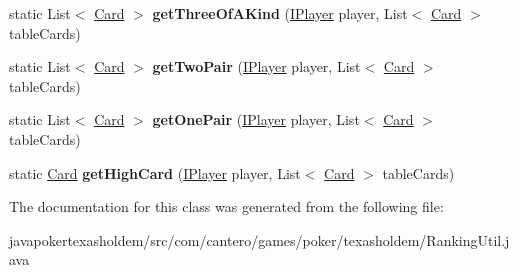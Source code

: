 \begin{DoxyCompactItemize}
\item 
\hypertarget{classcom_1_1cantero_1_1games_1_1poker_1_1texasholdem_1_1_ranking_util_aaba1e43f991f0980504f9c89c1c02f7a}{}static List$<$ \hyperlink{classcom_1_1cantero_1_1games_1_1poker_1_1texasholdem_1_1_card}{Card} $>$ {\bfseries get\+Three\+Of\+A\+Kind} (\hyperlink{interfacecom_1_1cantero_1_1games_1_1poker_1_1texasholdem_1_1_i_player}{I\+Player} player, List$<$ \hyperlink{classcom_1_1cantero_1_1games_1_1poker_1_1texasholdem_1_1_card}{Card} $>$ table\+Cards)\label{classcom_1_1cantero_1_1games_1_1poker_1_1texasholdem_1_1_ranking_util_aaba1e43f991f0980504f9c89c1c02f7a}

\item 
\hypertarget{classcom_1_1cantero_1_1games_1_1poker_1_1texasholdem_1_1_ranking_util_a9f5d327cc9ce8375f7df95ed7afd675d}{}static List$<$ \hyperlink{classcom_1_1cantero_1_1games_1_1poker_1_1texasholdem_1_1_card}{Card} $>$ {\bfseries get\+Two\+Pair} (\hyperlink{interfacecom_1_1cantero_1_1games_1_1poker_1_1texasholdem_1_1_i_player}{I\+Player} player, List$<$ \hyperlink{classcom_1_1cantero_1_1games_1_1poker_1_1texasholdem_1_1_card}{Card} $>$ table\+Cards)\label{classcom_1_1cantero_1_1games_1_1poker_1_1texasholdem_1_1_ranking_util_a9f5d327cc9ce8375f7df95ed7afd675d}

\item 
\hypertarget{classcom_1_1cantero_1_1games_1_1poker_1_1texasholdem_1_1_ranking_util_a323a8b6711b2e02e89be26f755209ad8}{}static List$<$ \hyperlink{classcom_1_1cantero_1_1games_1_1poker_1_1texasholdem_1_1_card}{Card} $>$ {\bfseries get\+One\+Pair} (\hyperlink{interfacecom_1_1cantero_1_1games_1_1poker_1_1texasholdem_1_1_i_player}{I\+Player} player, List$<$ \hyperlink{classcom_1_1cantero_1_1games_1_1poker_1_1texasholdem_1_1_card}{Card} $>$ table\+Cards)\label{classcom_1_1cantero_1_1games_1_1poker_1_1texasholdem_1_1_ranking_util_a323a8b6711b2e02e89be26f755209ad8}

\item 
\hypertarget{classcom_1_1cantero_1_1games_1_1poker_1_1texasholdem_1_1_ranking_util_a65017de417678c005ecdf70c6464f60e}{}static \hyperlink{classcom_1_1cantero_1_1games_1_1poker_1_1texasholdem_1_1_card}{Card} {\bfseries get\+High\+Card} (\hyperlink{interfacecom_1_1cantero_1_1games_1_1poker_1_1texasholdem_1_1_i_player}{I\+Player} player, List$<$ \hyperlink{classcom_1_1cantero_1_1games_1_1poker_1_1texasholdem_1_1_card}{Card} $>$ table\+Cards)\label{classcom_1_1cantero_1_1games_1_1poker_1_1texasholdem_1_1_ranking_util_a65017de417678c005ecdf70c6464f60e}

\end{DoxyCompactItemize}


The documentation for this class was generated from the following file\+:\begin{DoxyCompactItemize}
\item 
javapokertexasholdem/src/com/cantero/games/poker/texasholdem/Ranking\+Util.\+java\end{DoxyCompactItemize}
